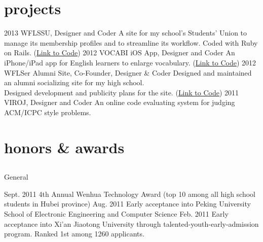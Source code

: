 \documentclass[]{friggeri-cv} %
\begin{document}

\section{projects}

\begin{entrylist}
\entry
{2013}
{WFLSSU, Designer and Coder}
{}
{A site for my school's Students' Union to manage its membership profiles and to streamline its workflow. Coded with Ruby on Rails. (\href{http://github.com/isundaylee/wflssu}{Link to Code})}
\entry
{2012}
{VOCABI iOS App, Designer and Coder}
{}
{An iPhone/iPad app for English learners to enlarge vocabulary. (\href{http://github.com/isundaylee/vocabi-ios}{Link to Code})}
\entry
{2012}
{WFLSer Alumni Site, Co-Founder, Designer \& Coder}
{}
{Designed and maintained an alumni socializing site for my high school. \\
Designed development and publicity plans for the site. (\href{http://github.com/isundaylee/alumni}{Link to Code})}
\entry
{2011}
{VIROJ, Designer and Coder}
{}
{An online code evaluating system for judging ACM/ICPC style problems. }
\end{entrylist}


\section{honors \& awards}

\subsection{}{General}
\begin{entrylist}
\centry
{Sept. 2011}
{4th Annual Wenhua Technology Award (top 10 among all high school students in Hubei province)}
\centry
{Aug. 2011}
{Early acceptance into Peking University School of Electronic Engineering and Computer Science}
\centry
{Feb. 2011}
{Early acceptance into Xi'an Jiaotong University through talented-youth-early-admission program. Ranked 1st among 1260 applicants. }
\end{entrylist}
\end{document}
